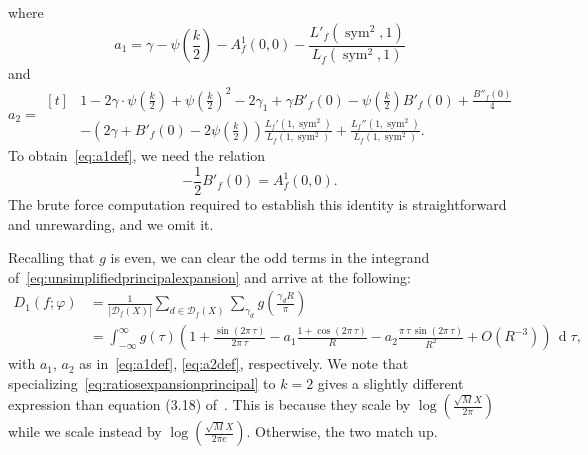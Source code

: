 \documentclass[11pt,reqno]{amsart} \usepackage{fullpage}
\renewcommand{\d}[1]{\,\operatorname*{d}\!{#1}}
\newcommand\be{\begin{equation}}
\newcommand\ee{\end{equation}}
\newcommand{\Lsym}[2][]{L_f#1\left(#2,\sym^2\right)}
\DeclareMathOperator{\sym}{sym}
\newcommand{\D}{\mathcal D_f}
\numberwithin{equation}{section}
\begin{document}
where
\be\label{eq:a1def}
a_1 = \gamma - \psi\left(\frac k 2\right) - A^1_f(0,0)
-\frac{L'_f(\sym^2,1)}{L_f(\sym^2,1)} \ee
and
\be\label{eq:a2def}
a_2 =
\begin{aligned}[t]
  & 1 -2\gamma\cdot\psi\left(\tfrac k2\right) +\psi\left(\tfrac k2\right)^2 -2\gamma_1
  +\gamma B'_f(0) -\psi\left(\tfrac k2\right) B'_f(0) +\frac{B''_f(0)}4 \\
  & -\left(2\gamma+B'_f(0)-2\psi\left(\tfrac k2\right)\right)
  \frac{\Lsym[']{1}}{\Lsym{1}}+\frac{\Lsym['']{1}}{\Lsym{1}}.
\end{aligned}\ee
To obtain~\eqref{eq:a1def}, we need the relation
\begin{equation}\label{eq:nightmareidentity}
  -\frac12 B'_f(0) = A^1_f(0,0). \end{equation}
The brute force computation required to establish this identity is straightforward and
unrewarding, and we omit it.

Recalling that $g$ is even, we can clear the odd terms in the integrand
of~\eqref{eq:unsimplifiedprincipalexpansion} and arrive at the following:
\be\begin{aligned}\label{eq:ratiosexpansionprincipal}
  D_1(f;\varphi)
  &=
  \frac1 {\left|\D(X)\right|}\sum_{d\in\D(X)}
  \sum_{\gamma_d}g\left(\frac{\gamma_d R}\pi\right) \\
  &=
  \int_{-\infty}^\infty g(\tau)
  \left(1+\frac{\sin(2\pi\,\tau)}{2\pi\,\tau}
    -a_1\frac{1+\cos(2\pi\,\tau)}{R}
    -a_2\frac{\pi\,\tau\,\sin(2\pi\,\tau)}{R^2}
    +O\left(R^{-3}\right)\right)\d\tau,
\end{aligned}\ee
with $a_1$, $a_2$ as in~\eqref{eq:a1def}, \eqref{eq:a2def},
respectively.
We note that specializing~\eqref{eq:ratiosexpansionprincipal}
to $k=2$ gives a slightly different expression than equation (3.18) of~\cite{HKS}.
This is because they scale by $\log \left(\tfrac{\sqrt M X}{2\pi}\right)$ while we scale
instead by $\log \left(\tfrac{\sqrt M X}{2\pi e}\right)$. Otherwise, the two match up.
\end{document}

